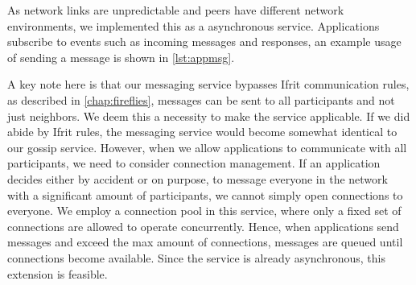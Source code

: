 \documentclass[USenglish]{uit-thesis}
\begin{document}
As network links are unpredictable and peers have different network environments, we implemented this as a asynchronous service.
Applications subscribe to events such as incoming messages and responses, an example usage of sending a message is shown in \autoref{lst:appmsg}.  



\begin{code}
\end{code}


A key note here is that our messaging service bypasses Ifrit communication rules, as described in \autoref{chap:fireflies}, messages can be sent to all participants and not just neighbors.
We deem this a necessity to make the service applicable.
If we did abide by Ifrit rules, the messaging service would become somewhat identical to our gossip service.
However, when we allow applications to communicate with all participants, we need to consider connection management.
If an application decides either by accident or on purpose, to message everyone in the network with a significant amount of participants, we cannot simply open connections to everyone.
We employ a connection pool in this service, where only a fixed set of connections are allowed to operate concurrently.
Hence, when applications send messages and exceed the max amount of connections, messages are queued until connections become available.
Since the service is already asynchronous, this extension is feasible.
 
\end{document}
